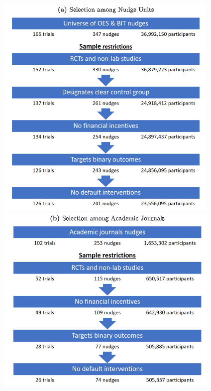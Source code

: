 \documentclass[dvipdfmx,11pt]{beamer}
\begin{document}
\begin{frame}{}
  \begin{figure}
    \centering
    \includegraphics[scale = .5]{fig_tab/os20220412/F2a}
    \includegraphics[scale = .5]{fig_tab/os20220412/F2b}
  \end{figure}
\end{frame}
\end{document}
